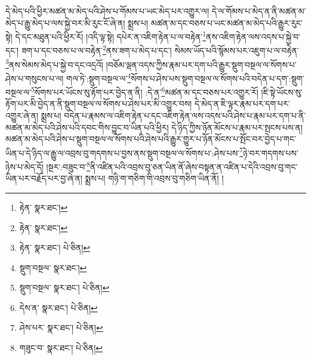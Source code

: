 དེ་མེད་པའི་ཕྱིར་མཚན་མ་མེད་པའི་ཤེས་པ་གོམས་པ་ཡང་མེད་པར་འགྱུར་ལ། དེ་ལ་གོམས་པ་མེད་ན་ནི་མཚན་མ་མེད་པ་རྒྱུ་མེད་པ་ལས་སྐྱེ་བར་མི་རུང་ངོ་ཞེ་ན། སྨྲས་པ། མཚན་མ་དང་བཅས་པ་ཡང་མཚན་མ་མེད་པའི་རྒྱུར་རུང་སྟེ། དེ་དང་མཐུན་པའི་ཕྱིར་རོ། །འདི་ལྟ་སྟེ། དཔེར་ན་འཇིག་རྟེན་པ་ལ་བརྟེན་\footnote{རྟེན་  སྣར་ཐང་། }ནས་འཇིག་རྟེན་ལས་འདས་པ་སྐྱེ་བ་དང་། ཟག་པ་དང་བཅས་པ་ལ་བརྟེན་\footnote{རྟེན་  སྣར་ཐང་། }ནས་ཟག་པ་མེད་པ་དང་། སེམས་ཡོད་པའི་སྙོམས་པར་འཇུག་པ་ལ་བརྟེན་\footnote{རྟེན་  སྣར་ཐང་།  པེ་ཅིན། }ནས་སེམས་མེད་པ་སྐྱེ་བ་དང་འདྲའོ། །བཅོམ་ལྡན་འདས་ཀྱིས་རྣམ་པར་དག་པའི་རྒྱུར་སྡུག་བསྔལ་ལ་སོགས་པ་ཤེས་པ་གསུངས་པ་ལ། གལ་ཏེ་:སྡུག་བསྔལ་ལ་\footnote{སྡུག་བསྔལ་  སྣར་ཐང་། }སོགས་པ་ཤེས་པས་སྡུག་བསྔལ་ལ་སོགས་པའི་བདེན་པ་དག་:སྡུག་བསྔལ་ལ་\footnote{སྡུག་བསྔལ་  སྣར་ཐང་།  པེ་ཅིན། }སོགས་པར་ཡོངས་སུ་རྟོག་པར་བྱེད་ན་ནི། :དེ་ན་\footnote{དེས་ན་  སྣར་ཐང་།  པེ་ཅིན། }མཚན་མ་དང་བཅས་པར་འགྱུར་རོ། །ཇི་སྟེ་ཡོངས་སུ་རྟོག་པར་མི་བྱེད་ན་ནི་སྡུག་བསྔལ་ལ་སོགས་པ་ཤེས་པར་མི་འགྱུར་བས། དེ་མེད་ན་ཇི་ལྟར་རྣམ་པར་དག་པར་འགྱུར་ཞེ་ན། སྨྲས་པ། བདེན་པ་རྣམས་ལ་འཇིག་རྟེན་པ་དང་འཇིག་རྟེན་ལས་འདས་པའི་ཤེས་པ་རྣམ་པར་དག་པ་ནི་མཚན་མ་མེད་པའི་ཤེས་པའི་དབང་གིས་བྱུང་བ་ཡིན་པའི་ཕྱིར། དེ་ཉིད་ཀྱིས་ཉོན་མོངས་པ་རྣམ་པར་སྤངས་པས་ན། མཚན་མ་མེད་པའི་ཤེས་པ་སྡུག་བསྔལ་ལ་སོགས་པའི་ཤེས་པའི་རྒྱུར་གྱུར་པ་ཉོན་མོངས་པ་སྤོང་བར་བྱེད་པ་གང་ཡིན་པ་དེ་ཉིད་ལ་རྒྱུ་ལ་འབྲས་བུ་གདགས་པ་བྱས་ནས་སྡུག་བསྔལ་ལ་སོགས་པ་:ཤེས་པས་\footnote{ཤེས་པར་  སྣར་ཐང་།  པེ་ཅིན། }ཉེ་བར་གདགས་པས་ཉེས་པ་མེད་དོ། །སྔར་:བཟུང་བ་\footnote{གཟུང་བ་  སྣར་ཐང་།  པེ་ཅིན། }ནི་འཛིན་པའི་འབྲས་བུ་ཅན་ཡིན་ནོ་ཞེས་བསྟན་ན་འཛིན་པ་དེའི་འབྲས་བུ་གང་ཡིན་པར་བརྗོད་པར་བྱ་ཞེ་ན། སྨྲས་པ། གཉི་ག་གཅིག་གི་འབྲས་བུ་གཅིག་ཡིན་ནོ། །
